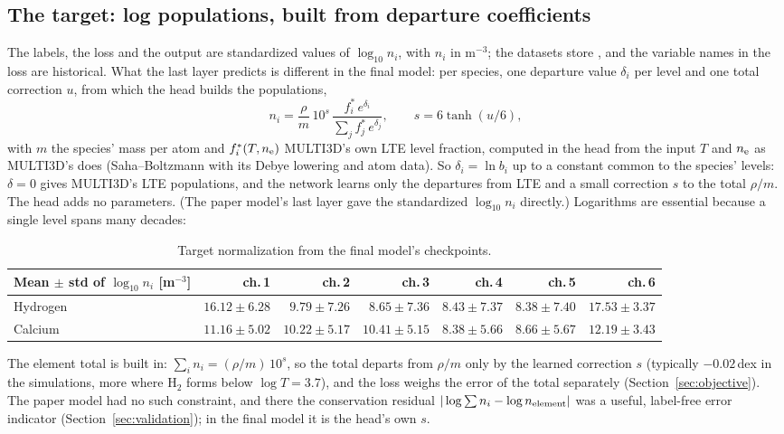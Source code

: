 \subsection{The target: log populations, built from departure coefficients}
The labels, the loss and the output are standardized values of $\log_{10}n_i$, with $n_i$ in m$^{-3}$; the datasets store , and the  variable names in the loss are historical. What the last layer predicts is different in the final model: per species, one departure value $\delta_i$ per level and one total correction $u$, from which the head builds the populations,
\begin{equation}
n_i=\frac{\rho}{m}\,10^{s}\,\frac{f^*_i\,e^{\delta_i}}{\sum_j f^*_j\,e^{\delta_j}},\qquad s=6\tanh(u/6),
\end{equation}
with $m$ the species' mass per atom and $f^*_i(T,n_{\rm e})$ MULTI3D's own LTE level fraction, computed in the head from the input $T$ and $n_{\rm e}$ as MULTI3D's  does (Saha--Boltzmann with its Debye lowering and atom data). So $\delta_i=\ln b_i$ up to a constant common to the species' levels: $\delta=0$ gives MULTI3D's LTE populations, and the network learns only the departures from LTE and a small correction $s$ to the total $\rho/m$. The head adds no parameters. (The paper model's last layer gave the standardized $\log_{10}n_i$ directly.) Logarithms are essential because a single level spans many decades:

\begin{table}[H]\centering\small
\begin{tabular}{l*{6}{r}}
\toprule
Mean $\pm$ std of $\log_{10}n_i$ [m$^{-3}$]&ch.\,1&ch.\,2&ch.\,3&ch.\,4&ch.\,5&ch.\,6\\\midrule
Hydrogen&$16.12\pm6.28$&$9.79\pm7.26$&$8.65\pm7.36$&$8.43\pm7.37$&$8.38\pm7.40$&$17.53\pm3.37$\\
Calcium&$11.16\pm5.02$&$10.22\pm5.17$&$10.41\pm5.15$&$8.38\pm5.66$&$8.66\pm5.67$&$12.19\pm3.43$\\
\bottomrule
\end{tabular}
\caption{Target normalization from the final model's checkpoints.}
\end{table}

The element total is built in: $\sum_i n_i=(\rho/m)\,10^s$, so the total departs from $\rho/m$ only by the learned correction $s$ (typically $-0.02$\,dex in the  simulations, more where H$_2$ forms below $\log T=3.7$), and the loss weighs the error of the total separately (Section~\ref{sec:objective}). The paper model had no such constraint, and there the conservation residual $|\log\sum n_i-\log n_{\rm element}|$ was a useful, label-free error indicator (Section~\ref{sec:validation}); in the final model it is the head's own $s$.

